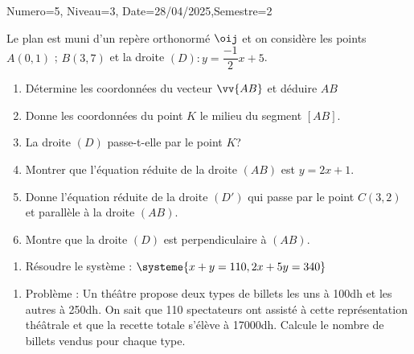 \documentclass[a4paper,12pt]{article}
\begin{document}
\begin{Maquette}[DS]{Numero=5, Niveau=3, Date=28/04/2025,Semestre=2}

\begin{exercice}[BaremeDetaille=true]
Le plan est muni d'un repère orthonormé $\oij$ et on considère les points $A(0,1)$ ; $B(3,7)$ et la droite $(D):y=\dfrac{-1}{2}x+5$.
\begin{enumerate}
\item {}Détermine les coordonnées du vecteur $\vv{AB}$ et déduire $AB$\newline
\anserline[2]
\item {}Donne les coordonnées du point $K$ le milieu du segment $[AB]$.\newline
\anserline[2]
\item {}La droite $(D)$ passe-t-elle par le point $K$?
\newline
\anserline[2]
\item {}Montrer que l'équation réduite de la droite $(AB)$ est $y=2x+1$.
\newline
\anserline[7]
\item{} Donne l'équation réduite de la droite $(D')$ qui passe par le point $C(3,2)$ et parallèle à la droite $(AB)$.
\newline\anserline[4]
\item {}Montre que la droite $(D)$ est perpendiculaire à $(AB)$.\newline\anserline[4]
\end{enumerate}
\end{exercice}

\begin{exercice}[BaremeDetaille=true]
	\begin{enumerate}
		\item {} Résoudre le système : 	$\systeme{x+y=110,2x+5y=340}$
\end{enumerate}
\begin{multicols}{2}
	\anserline[8]
	\columnbreak
	
	\anserline[8]
\end{multicols}
\begin{enumerate}[start=2]
		\item{} Problème : \newline
		 Un théâtre propose deux types de billets les uns à 100dh et les autres à 250dh. On sait que 110 spectateurs ont assisté à cette représentation théâtrale et que la recette totale s'élève à 17000dh.\newline
		Calcule le nombre de billets vendus pour chaque type.
	\end{enumerate}
	\begin{minipage}{0.48\linewidth}
			\anserline[13]
	\end{minipage}\hfill\vrule\hfill
		\begin{minipage}{0.48\linewidth}
		\anserline[13]
	\end{minipage}

\end{exercice}


\end{Maquette}
\end{document}
